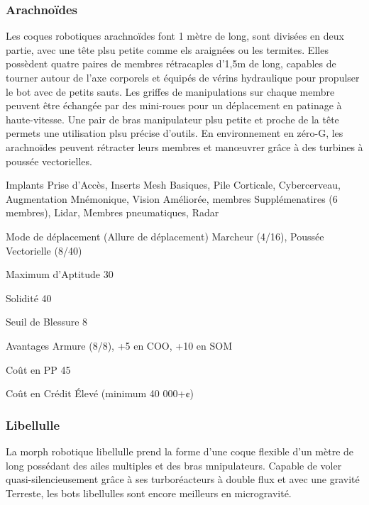 \subsubsection{Arachnoïdes} \label{sec:starting-arachnoids} 

Les coques robotiques arachnoïdes font 1 mètre de long, sont divisées en deux partie, avec une tête plsu petite comme els araignées ou les termites. Elles possèdent quatre paires de membres rétracaples d'1,5m de long, capables de tourner autour de l'axe corporels et équipés de vérins hydraulique pour propulser le bot avec de petits sauts. Les griffes de manipulations sur chaque membre peuvent être échangée par des mini-roues pour un déplacement en patinage à haute-vitesse. Une pair de bras manipulateur plsu petite et proche de la tête permets une utilisation plsu précise d'outils. En environnement en zéro-G, les arachnoïdes peuvent rétracter leurs membres et manœuvrer grâce à des turbines à poussée vectorielles. 

\begin{description*} \item[Implants] Prise d'Accès, Inserts Mesh Basiques, Pile Corticale, Cybercerveau, Augmentation Mnémonique, Vision Améliorée, membres Supplémenatires (6 membres), Lidar, Membres pneumatiques, Radar\item[Mode de déplacement](Allure de déplacement) Marcheur (4/16), Poussée Vectorielle (8/40)\item[Maximum d'Aptitude] 30 \item[Solidité] 40 \item[Seuil de Blessure] 8 \item[Avantages] Armure (8/8), +5 en COO, +10 en SOM \item[Coût en PP] 45 \item[Coût en Crédit] Élevé (minimum 40 000+¢) \end{description*} 

\subsubsection{Libellulle} \label{sec:starting-dragonfly} 

La morph robotique libellulle prend la forme d'une coque flexible d'un mètre de long possédant des ailes multiples et des bras mnipulateurs. Capable de voler quasi-silencieusement grâce à ses turboréacteurs à double flux et avec une gravité Terreste, les bots libellulles sont encore meilleurs en microgravité. 

